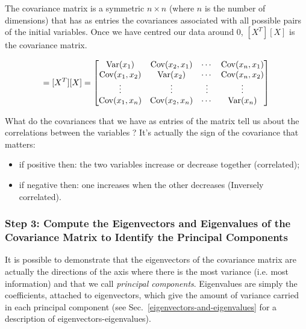 The covariance matrix is a symmetric $n\times n$ (where $n$ is the number of dimensions) that has as entries the covariances associated with all possible pairs of the initial variables. %
Once we have centred our data around 0, $[X^T][X]$ is the covariance matrix.

\begin{equation}
	[\Sigma]=[X^T][X] =
	\begin{bmatrix}
		\var(x_1) & \cov(x_2, x_1) & \cdots & \cov(x_n, x_1) \\
		\cov(x_1, x_2) & \var(x_2) & \cdots & \cov(x_n, x_2) \\
		\vdots & \vdots & \vdots & \vdots \\
		\cov(x_1, x_n) & \cov(x_2, x_n) & \cdots & \var(x_n)
	\end{bmatrix}
\end{equation}

What do the covariances that we have as entries of the matrix tell us about the correlations between the variables ?
It’s actually the sign of the covariance that matters:
\begin{itemize}
	\item if positive then: the two variables increase or decrease together (correlated);
	\item if negative then: one increases when the other decreases (Inversely correlated).
\end{itemize}

\subsubsection*{Step 3: Compute the Eigenvectors and Eigenvalues of the Covariance Matrix to Identify the Principal Components}

It is possible to demonstrate that the eigenvectors of the covariance matrix are actually the directions of the axis where there is the most variance (i.e. most information) and that we call \emph{principal components}. Eigenvalues are simply the coefficients, attached to eigenvectors, which give the amount of variance carried in each principal component (see Sec.~\ref{eigenvectors-and-eigenvalues} for a description of eigenvectors-eigenvalues).

